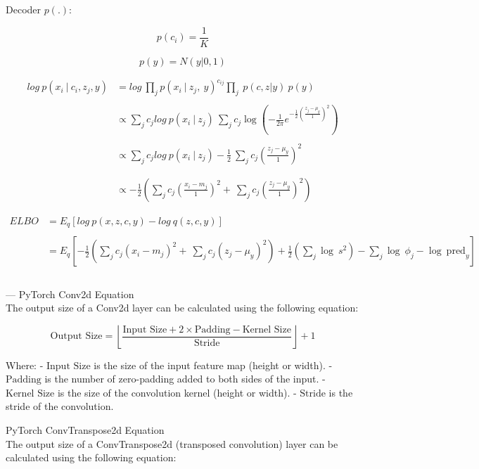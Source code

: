 \documentclass[12pt]{article}
\begin{document}
Decoder $p(.)$:


$$p(c_i) = \dfrac{1}{K}$$

$$p(y) = N(y|0,1)$$

\begin{align*}
log~p(x_i~\vert~c_i, z_{j},y) &= log~\prod_j p(x_i~\vert~z_j ,~y)^{c_{ij}} \prod_{j}~p(c,z|y) ~p(y)\\ \\
 &\propto \sum_j c_{j} log~p(x_i~\vert~z_j)~\sum_{j}c_{j}\log\left( -\frac{1}{2\pi}e^{-\frac{1}{2}\left( \frac{z_{j}-\mu_{y}}{1} \right)^2} \right) \\ \\
 &\propto \sum_j c_{j} log~p(x_i~\vert~z_j)  -\frac{1}{2}~\sum_{j}c_{j}\left( \frac{z_{j}-\mu_{y}}{1} \right)^2 \\ \\ \\
&\propto -\frac{1}{2}( \sum_j c_{j}\left( \frac{x_{i}-m_{j}}{1} \right)^2+~\sum_{j}c_{j}\left( \frac{z_{j}-\mu_{y}}{1} \right)^2)
\end{align*}


\begin{align*}
ELBO  &= E_q[log~p(x,z,c,y) - log~q(z,c,y)] \\ \\
&= E_{q}[-\frac{1}{2}( \sum_j c_{j}\left( x_{i}-m_{j} \right)^2+~\sum_{j}c_{j}\left( z_{j}-\mu_{y} \right)^2) + \frac{1}{2}\left(\sum_{j} \log~s^2  \right) - \sum_{j} \log~ \phi_{j} - \log~ \text{pred}_{y}] \\ \\
\end{align*}

--- PyTorch Conv2d Equation \\

The output size of a Conv2d layer can be calculated using the following equation:

\[ \text{Output Size} = \left\lfloor \frac{\text{Input Size} + 2 \times \text{Padding} - \text{Kernel Size}}{\text{Stride}} \right\rfloor + 1 \]

Where:
- \(\text{Input Size}\) is the size of the input feature map (height or width).
- \(\text{Padding}\) is the number of zero-padding added to both sides of the input.
- \(\text{Kernel Size}\) is the size of the convolution kernel (height or width).
- \(\text{Stride}\) is the stride of the convolution.

PyTorch ConvTranspose2d Equation\\

The output size of a ConvTranspose2d (transposed convolution) layer can be calculated using the following equation:
\end{document}
